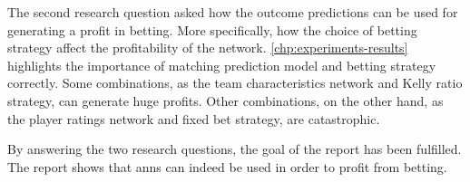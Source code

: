 The second research question asked how the outcome predictions can be used for generating a profit in betting. More specifically, how the choice of betting strategy affect the profitability of the network. \cref{chp:experiments-results} highlights the importance of matching prediction model and betting strategy correctly. Some combinations, as the team characteristics network and Kelly ratio strategy, can generate huge profits. Other combinations, on the other hand, as the player ratings network and fixed bet strategy, are catastrophic.

By answering the two research questions, the goal of the report has been fulfilled. The report shows that \glspl{ann} can indeed be used in order to profit from betting.

